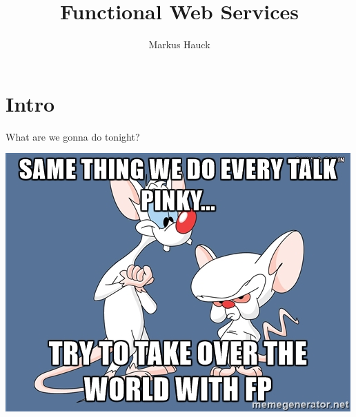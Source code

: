 \documentclass{beamer}
\author{Markus Hauck}
\institute{codecentric AG}
\title{Functional Web Services}
\begin{document}
{
  \begin{frame}
    \titlepage{}
  \end{frame}
}

\section{Intro}

\begin{frame}
  \begin{center}
    \huge
    What are we gonna do tonight?
  \end{center}
\end{frame}

\begin{frame}
  \begin{center}
    \includegraphics[width=0.7\paperwidth]{../pics/pinkybrain.jpg}
  \end{center}
\end{frame}
\end{document}
